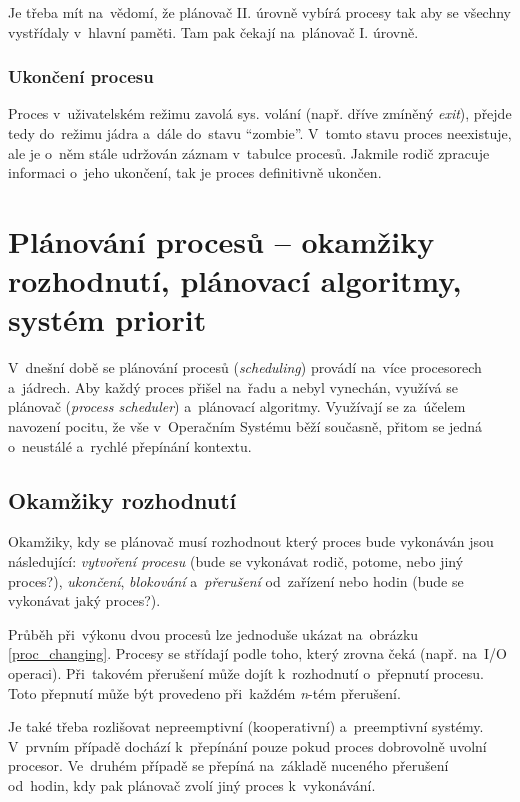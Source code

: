 Je třeba mít na~vědomí, že plánovač II. úrovně vybírá procesy tak aby se všechny vystřídaly v~hlavní paměti. Tam pak čekají na~plánovač I. úrovně.

\subsubsection{Ukončení procesu}

Proces v~uživatelském režimu zavolá sys. volání (např. dříve zmíněný \emph{exit}), přejde tedy do~režimu jádra a~dále do~stavu \enquote{zombie}. V~tomto stavu proces neexistuje, ale je o~něm stále udržován záznam v~tabulce procesů. Jakmile rodič zpracuje informaci o~jeho ukončení, tak je proces definitivně ukončen.


\clearpage
\section{Plánování procesů -- okamžiky rozhodnutí, plánovací algoritmy, systém priorit}
\label{planning}

V~dnešní době se plánování procesů (\emph{scheduling}) provádí na~více procesorech a~jádrech. Aby každý proces přišel na~řadu a nebyl vynechán, využívá se plánovač (\emph{process scheduler}) a~plánovací algoritmy. Využívají se za~účelem navození pocitu, že vše v~Operačním Systému běží současně, přitom se jedná o~neustálé a~rychlé přepínání kontextu.

\subsection{Okamžiky rozhodnutí}

Okamžiky, kdy se plánovač musí rozhodnout který proces bude vykonáván jsou následující: \emph{vytvoření procesu} (bude se vykonávat rodič, potome, nebo jiný proces?), \emph{ukončení}, \emph{blokování} a~\emph{přerušení} od~zařízení nebo hodin (bude se vykonávat jaký proces?).

Průběh při~výkonu dvou procesů lze jednoduše ukázat na~obrázku \ref{proc_changing}. Procesy se střídají podle toho, který zrovna čeká (např. na~I/O operaci). Při~takovém přerušení může dojít k~rozhodnutí o~přepnutí procesu. Toto přepnutí může být provedeno při~každém \emph{n}-tém přerušení.

Je také třeba rozlišovat nepreemptivní (kooperativní) a~preemptivní systémy. V~prvním případě dochází k~přepínání pouze pokud proces dobrovolně uvolní procesor. Ve~druhém případě se přepíná na~základě nuceného přerušení od~hodin, kdy pak plánovač zvolí jiný proces k~vykonávání.

